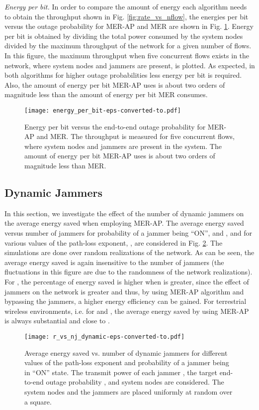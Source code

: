 \documentclass[10pt,journal]{IEEEtran}
\theoremstyle{definition}
\begin{document}
\textit{Energy per bit.} In order to compare the amount of energy each algorithm needs to obtain the throughput shown in Fig. \ref{fig:rate_vs_nflow}, the energies per bit versus the outage probability for MER-AP and MER are shown in Fig. \ref{fig:energy_per_bit}. Energy per bit  is obtained by dividing the total power consumed by the system nodes divided by the maximum throughput of the network for a given number of flows. In this figure, the maximum throughput when five concurrent flows exists in the network, where  system nodes and  jammers are present, is plotted. 
As expected,  in both algorithms for higher outage probabilities less energy per bit is required. 
Also, the amount of energy per bit MER-AP uses is about two orders of magnitude less than the amount of energy per bit MER consumes.
\begin{figure}
\begin{center}
 \texttt{[image: energy\_per\_bit-eps-converted-to.pdf]}
 \end{center}
 \caption{Energy per bit versus the end-to-end outage probability for MER-AP and MER.  The  throughput is measured for five concurrent flows, where  system nodes and  jammers are present in the system. The amount of energy per bit MER-AP uses is about two orders of magnitude less than MER. }
\label{fig:energy_per_bit}
 \end{figure} \subsection{Dynamic Jammers}
In this section, we investigate  the effect of the number of dynamic jammers  on the average energy saved when employing MER-AP.
 The average energy saved versus number of jammers for probability of a jammer being  ``ON'',  and , and for various values of the path-loss exponent, , are considered in Fig. \ref{fig:r_vs_nj_dynamic}. 
The simulations are done over  random realizations of the network.
As can be seen, the average energy saved is again insensitive to the number of jammers (the fluctuations in this figure are due to the randomness of the network realizations). 
For ,  the percentage of energy saved is higher  when  is greater, since the effect of jammers on the network is greater and thus, by using MER-AP algorithm and bypassing the jammers, a higher energy efficiency can be gained. 
 For terrestrial wireless environments, i.e. for  and , the average energy saved by using MER-AP is always substantial and close to .
\begin{figure}
\begin{center}
	\texttt{[image: r\_vs\_nj\_dynamic-eps-converted-to.pdf]}
 \end{center}
 \caption{Average energy saved vs. number of dynamic jammers for different values of the path-loss exponent and probability  of a jammer being in ``ON'' state. The transmit power of each jammer , the target end-to-end outage probability , and  system nodes  are considered. The system nodes and the jammers are placed uniformly at random over a  square. }
 \label{fig:r_vs_nj_dynamic}
 \end{figure}
\end{document}
